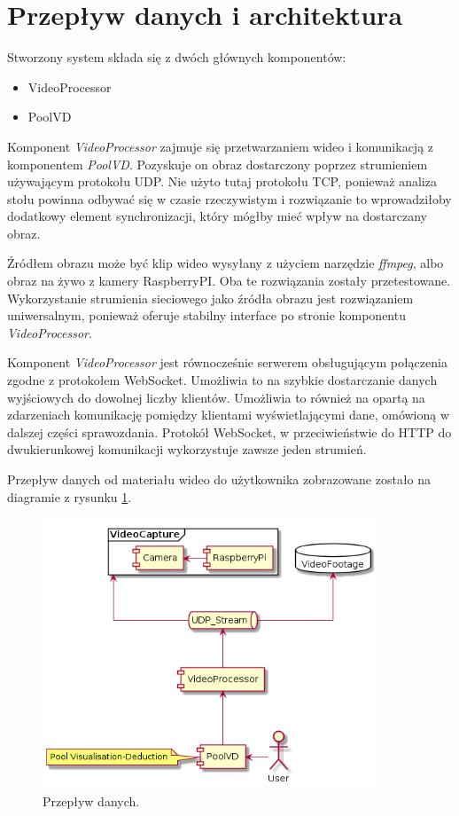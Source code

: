 \documentclass[12pt]{article}
\begin{document}
\section{Przepływ danych i architektura}

Stworzony system składa się z dwóch głównych komponentów:
\begin{itemize}[noitemsep]
    \item VideoProcessor
    \item PoolVD
\end{itemize}

Komponent \textit{VideoProcessor} zajmuje się przetwarzaniem wideo i komunikacją z komponentem \textit{PoolVD}. Pozyskuje on obraz dostarczony poprzez strumieniem używającym protokołu UDP. Nie użyto tutaj protokołu TCP, ponieważ analiza stołu powinna odbywać się w czasie rzeczywistym i rozwiązanie to wprowadziłoby dodatkowy element synchronizacji, który mógłby mieć wpływ na dostarczany obraz.

Źródłem obrazu może być klip wideo wysyłany z użyciem narzędzie \textit{ffmpeg}, albo obraz na żywo z kamery RaspberryPI. Oba te rozwiązania zostały przetestowane. Wykorzystanie strumienia sieciowego jako źródła obrazu jest rozwiązaniem uniwersalnym, ponieważ oferuje stabilny interface po stronie komponentu \textit{VideoProcessor}.

Komponent \textit{VideoProcessor} jest równocześnie serwerem obsługującym połączenia zgodne z protokołem WebSocket. Umożliwia to na szybkie dostarczanie danych wyjściowych do dowolnej liczby klientów. Umożliwia to również na opartą na zdarzeniach komunikację pomiędzy klientami wyświetlającymi dane, omówioną w dalszej części sprawozdania. Protokół WebSocket, w przeciwieństwie do HTTP do dwukierunkowej komunikacji wykorzystuje zawsze jeden strumień.

Przepływ danych od materiału wideo do użytkownika zobrazowane zostało na diagramie z rysunku \ref{dataflow}.


\begin{figure}[!ht]
    \centering
    \includegraphics[width=10cm]{./diagrams/out/data_flow.png}
    \caption{Przepływ danych.}
    \label{dataflow}
\end{figure}
\end{document}
